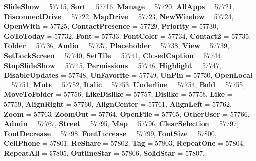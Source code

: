 \begin{DoxyCompactItemize}
\newline
{\bfseries Slide\+Show} = 57715, 
{\bfseries Sort} = 57716, 
{\bfseries Manage} = 57720, 
{\bfseries All\+Apps} = 57721, 
\newline
{\bfseries Disconnect\+Drive} = 57722, 
{\bfseries Map\+Drive} = 57723, 
{\bfseries New\+Window} = 57724, 
{\bfseries Open\+With} = 57725, 
\newline
{\bfseries Contact\+Presence} = 57729, 
{\bfseries Priority} = 57730, 
{\bfseries Go\+To\+Today} = 57732, 
{\bfseries Font} = 57733, 
\newline
{\bfseries Font\+Color} = 57734, 
{\bfseries Contact2} = 57735, 
{\bfseries Folder} = 57736, 
{\bfseries Audio} = 57737, 
\newline
{\bfseries Placeholder} = 57738, 
{\bfseries View} = 57739, 
{\bfseries Set\+Lock\+Screen} = 57740, 
{\bfseries Set\+Tile} = 57741, 
\newline
{\bfseries Closed\+Caption} = 57744, 
{\bfseries Stop\+Slide\+Show} = 57745, 
{\bfseries Permissions} = 57746, 
{\bfseries Highlight} = 57747, 
\newline
{\bfseries Disable\+Updates} = 57748, 
{\bfseries Un\+Favorite} = 57749, 
{\bfseries Un\+Pin} = 57750, 
{\bfseries Open\+Local} = 57751, 
\newline
{\bfseries Mute} = 57752, 
{\bfseries Italic} = 57753, 
{\bfseries Underline} = 57754, 
{\bfseries Bold} = 57755, 
\newline
{\bfseries Move\+To\+Folder} = 57756, 
{\bfseries Like\+Dislike} = 57757, 
{\bfseries Dislike} = 57758, 
{\bfseries Like} = 57759, 
\newline
{\bfseries Align\+Right} = 57760, 
{\bfseries Align\+Center} = 57761, 
{\bfseries Align\+Left} = 57762, 
{\bfseries Zoom} = 57763, 
\newline
{\bfseries Zoom\+Out} = 57764, 
{\bfseries Open\+File} = 57765, 
{\bfseries Other\+User} = 57766, 
{\bfseries Admin} = 57767, 
\newline
{\bfseries Street} = 57795, 
{\bfseries Map} = 57796, 
{\bfseries Clear\+Selection} = 57797, 
{\bfseries Font\+Decrease} = 57798, 
\newline
{\bfseries Font\+Increase} = 57799, 
{\bfseries Font\+Size} = 57800, 
{\bfseries Cell\+Phone} = 57801, 
{\bfseries Re\+Share} = 57802, 
\newline
{\bfseries Tag} = 57803, 
{\bfseries Repeat\+One} = 57804, 
{\bfseries Repeat\+All} = 57805, 
{\bfseries Outline\+Star} = 57806, 
\newline
{\bfseries Solid\+Star} = 57807, 

\end{DoxyCompactItemize}
